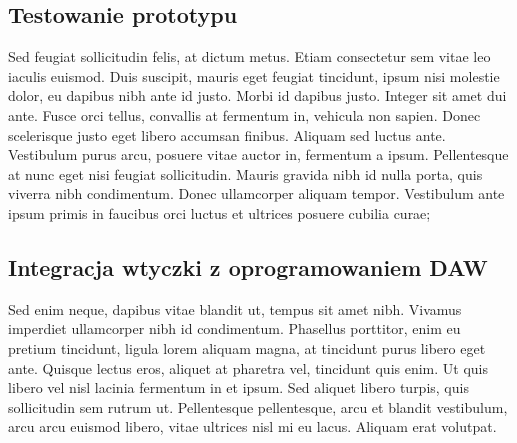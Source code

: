 \subsection{Testowanie prototypu}
\begin{spacing}{1.5} %
    Sed feugiat sollicitudin felis, at dictum metus. Etiam consectetur sem vitae leo iaculis euismod. Duis suscipit, mauris eget feugiat tincidunt, ipsum nisi molestie dolor, eu dapibus nibh ante id justo. Morbi id dapibus justo. Integer sit amet dui ante. Fusce orci tellus, convallis at fermentum in, vehicula non sapien. Donec scelerisque justo eget libero accumsan finibus. Aliquam sed luctus ante. Vestibulum purus arcu, posuere vitae auctor in, fermentum a ipsum. Pellentesque at nunc eget nisi feugiat sollicitudin. Mauris gravida nibh id nulla porta, quis viverra nibh condimentum. Donec ullamcorper aliquam tempor. Vestibulum ante ipsum primis in faucibus orci luctus et ultrices posuere cubilia curae; 
\end{spacing} %

\subsection{Integracja wtyczki z oprogramowaniem DAW} %
\begin{spacing}{1.5} %
    Sed enim neque, dapibus vitae blandit ut, tempus sit amet nibh. Vivamus imperdiet ullamcorper nibh id condimentum. Phasellus porttitor, enim eu pretium tincidunt, ligula lorem aliquam magna, at tincidunt purus libero eget ante. Quisque lectus eros, aliquet at pharetra vel, tincidunt quis enim. Ut quis libero vel nisl lacinia fermentum in et ipsum. Sed aliquet libero turpis, quis sollicitudin sem rutrum ut. Pellentesque pellentesque, arcu et blandit vestibulum, arcu arcu euismod libero, vitae ultrices nisl mi eu lacus. Aliquam erat volutpat. 
\end{spacing} %
